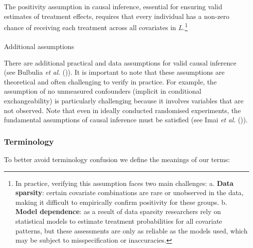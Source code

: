 \documentclass[
  single column]{article}
\makeatletter
\let\oldparagraph\paragraph
\renewcommand{\paragraph}{
    \@ifstar
      \xxxParagraphStar
      \xxxParagraphNoStar
  }
\newcommand{\xxxParagraphStar}[1]{\oldparagraph*{#1}\mbox{}}
\newcommand{\xxxParagraphNoStar}[1]{\oldparagraph{#1}\mbox{}}
\makeatother
\begin{document}
The positivity assumption in causal inference, essential for ensuring
valid estimates of treatment effects, requires that every individual has
a non-zero chance of receiving each treatment across all covariates in
\(L\).\footnote{In practice, verifying this assumption faces two main
  challenges: a. \textbf{Data sparsity}: certain covariate combinations
  are rare or unobserved in the data, making it difficult to empirically
  confirm positivity for these groups. b. \textbf{Model dependence}: as
  a result of data sparsity researchers rely on statistical models to
  estimate treatment probabilities for all covariate patterns, but these
  assessments are only as reliable as the models used, which may be
  subject to misspecification or inaccuracies.}

\paragraph{Additional assumptions}\label{additional-assumptions}

There are additional practical and data assumptions for valid causal
inference (see Bulbulia \emph{et al.}
()). It is important to note that
these assumptions are theoretical and often challenging to verify in
practice. For example, the assumption of no unmeasured confounders
(implicit in conditional exchangeability) is particularly challenging
because it involves variables that are not observed. Note that even in
ideally conducted randomised experiments, the fundamental assumptions of
causal inference must be satisfied (see Imai \emph{et al.}
()).

\subsubsection{Terminology}\label{terminology}

To better avoid terminology confusion we define the meanings of our
terms:
\end{document}
